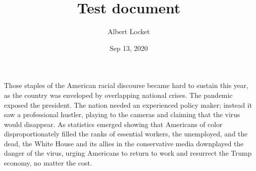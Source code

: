 \documentclass[12pt,titlepage]{article}
\begin{document}
\frenchspacing

\title{Test document}
\author{Albert Locket}
\date{Sep 13, 2020}

Those staples of the American racial discourse became hard to sustain this year, as the country was enveloped by overlapping national crises. The pandemic exposed the president. The nation needed an experienced policy maker; instead it saw a professional hustler, playing to the cameras and claiming that the virus would disappear. As statistics emerged showing that Americans of color disproportionately filled the ranks of essential workers, the unemployed, and the dead, the White House and its allies in the conservative media downplayed the danger of the virus, urging Americans to return to work and resurrect the Trump economy, no matter the cost.
\end{document}

